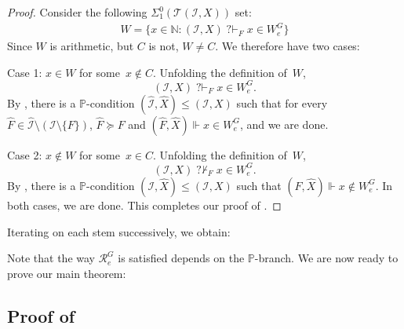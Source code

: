 \documentclass[10pt,a4paper]{article}
\def\PP{\mathbb{P}}
\def\Tc{\mathcal{T}}
\def\I{\mathcal{I}}
\def\Rc{\mathcal{R}}
\newcommand{\qvdash}{\operatorname{{?}{\vdash}}}
\newcommand{\nqvdash}{\operatorname{{?}{\nvdash}}}
\newcommand{\NN}[0]{\mathbb{N}}
\def\h#1{\hat{#1}}
\numberwithin{theorem}{section}
\newtheorem{lemma}[theorem]{Lemma}
\begin{document}
\begin{proof}
Consider the following $\Sigma^0_1(\Tc(\I, X))$ set:
\begin{align*}
W = \{ x \in \NN : (\I, X) \qvdash_F x \in W_e^G \}
\end{align*}
Since $W$ is arithmetic, but $C$ is not, $W \neq C$.
We therefore have two cases:
\smallskip

\noindent
Case 1: $x \in W$ for some~$x \not \in C$. Unfolding the definition of~$W$, 
$$(\I, X) \qvdash_F x \in W_e^G.$$
By , there is a $\PP$-condition $(\h \I, \h X) \leq (\I, X)$ such that for every~$\h F \in \h \I \setminus (\I \setminus \{F\})$, $\h F \succeq F$ and $(\h F, \h X) \Vdash x \in W_e^G$, and we are done.
\smallskip

\noindent
Case 2: $x \not \in W$ for some~$x \in C$. Unfolding the definition of~$W$, 
$$(\I, X) \nqvdash_F x \in W_e^G.$$
By , there is a $\PP$-condition $(\I, \h X) \leq (\I, X)$ such that $(F, \h X) \Vdash x \not \in W^G_e$.
In both cases, we are done. This completes our proof of .
\end{proof}

Iterating  on each stem successively, we obtain:


Note that the way $\Rc^G_e$ is satisfied depends on the $\PP$-branch.
We are now ready to prove our main theorem:

\subsection{Proof of }
\end{document}
